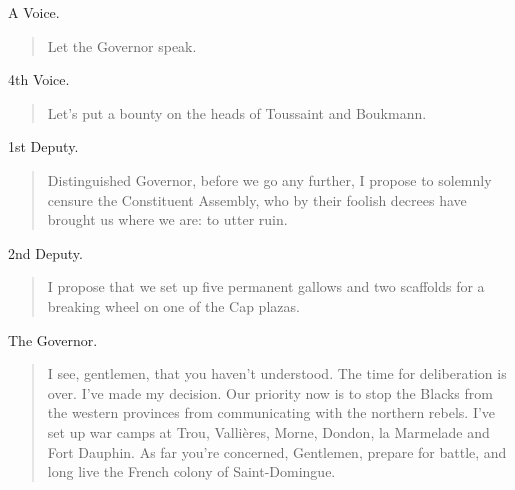 \documentclass[letterpaper,article,12pt,oneside,notitlepage]{memoir}
\begin{document}
\begin{center}A Voice.\end{center}

\begin{verse}
\hspace{1cm} Let the Governor speak. \\
\end{verse}

\begin{center}4th Voice.\end{center}

\begin{verse}
\hspace{1cm} Let's put a bounty on the heads of Toussaint and Boukmann. \\
\end{verse}

\begin{center}1st Deputy.\end{center}

\begin{verse}
\indent Distinguished Governor, before we go any further, I propose to solemnly censure the Constituent Assembly, who by their foolish decrees have brought us where we are: to utter ruin. \\
\end{verse}

\clearpage

\begin{center}2nd Deputy.\end{center}

\begin{verse}
\indent I propose that we set up five permanent gallows and two scaffolds for a breaking wheel on one of the Cap plazas. \\
\end{verse}

\begin{center}The Governor.\end{center}

\begin{verse}
\indent I see, gentlemen, that you haven't understood. The time for deliberation is over. I've made my decision. Our priority now is to stop the Blacks from the western provinces from communicating with the northern rebels. I've set up war camps at Trou, Vallières, Morne, Dondon, la Marmelade and Fort Dauphin. As far you're concerned, Gentlemen, prepare for battle, and long live the French colony of Saint-Domingue. \\
\end{verse}
\end{document}
